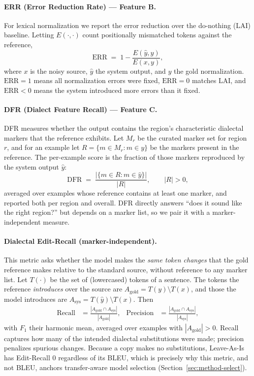 \documentclass[11pt]{article}
\begin{document}
\paragraph{ERR (Error Reduction Rate) --- Feature B.}
For lexical normalization we report the error reduction over the do-nothing (LAI)
baseline. Letting $E(\cdot,\cdot)$ count positionally mismatched tokens against the
reference,
\begin{equation}
  \mathrm{ERR} \;=\; 1 - \frac{E(\hat{y}, y)}{E(x, y)},
  \label{eq:err}
\end{equation}
where $x$ is the noisy source, $\hat{y}$ the system output, and $y$ the gold
normalization. $\mathrm{ERR}=1$ means all normalization errors were fixed,
$\mathrm{ERR}=0$ matches LAI, and $\mathrm{ERR}<0$ means the system introduced more
errors than it fixed.

\paragraph{DFR (Dialect Feature Recall) --- Feature C.}
DFR measures whether the output contains the region's characteristic dialectal
markers that the reference exhibits. Let $M_r$ be the curated marker set for region
$r$, and for an example let $R = \{m \in M_r : m \in y\}$ be the markers present in
the reference. The per-example score is the fraction of those markers reproduced by
the system output $\hat{y}$:
\begin{equation}
  \mathrm{DFR} \;=\; \frac{\bigl|\{m \in R : m \in \hat{y}\}\bigr|}{|R|},
  \qquad |R| > 0,
  \label{eq:dfr}
\end{equation}
averaged over examples whose reference contains at least one marker, and reported
both per region and overall. DFR directly answers ``does it sound like the right
region?'' but depends on a marker list, so we pair it with a marker-independent
measure.

\paragraph{Dialectal Edit-Recall (marker-independent).}
This metric asks whether the model makes the \emph{same token changes} that the
gold reference makes relative to the standard source, without reference to any
marker list. Let $T(\cdot)$ be the set of (lowercased) tokens of a sentence. The
tokens the reference \emph{introduces} over the source are
$A_{\mathrm{gold}} = T(y) \setminus T(x)$, and those the model introduces are
$A_{\mathrm{sys}} = T(\hat{y}) \setminus T(x)$. Then
\begin{align}
  \mathrm{Recall} &= \frac{|A_{\mathrm{gold}} \cap A_{\mathrm{sys}}|}{|A_{\mathrm{gold}}|},
  &
  \mathrm{Precision} &= \frac{|A_{\mathrm{gold}} \cap A_{\mathrm{sys}}|}{|A_{\mathrm{sys}}|},
  \label{eq:editrecall}
\end{align}
with $F_1$ their harmonic mean, averaged over examples with $|A_{\mathrm{gold}}|>0$.
Recall captures how many of the intended dialectal substitutions were made;
precision penalizes spurious changes. Because a copy makes no substitutions,
Leave-As-Is has Edit-Recall $0$ regardless of its BLEU, which is precisely why this
metric, and not BLEU, anchors transfer-aware model selection
(Section~\ref{sec:method-select}).
\end{document}
